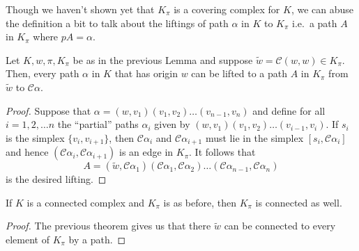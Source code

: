 Though we haven't shown yet that $K_{\pi}$ is a covering complex for $K$, we can abuse the definition a bit to talk about the liftings of path $\alpha$ in $K$ to $K_{\pi}$ i.e.\ a path $A$ in $K_{\pi}$ where $pA = \alpha$.

\begin{lemma}
  \label{lem:pilift}
  Let $K,w,\pi,K_{\pi}$ be as in the previous Lemma and suppose $\tilde{w} = \mathcal{C}(w,w) \in K_{\pi}$. Then, every path $\alpha$ in $K$ that has origin $w$ can be lifted to a path $A$ in $K_{\pi}$ from $\tilde{w}$ to $\mathcal{C}\alpha$.
\end{lemma}

\begin{proof}
  Suppose that $\alpha = (w,v_1)(v_1,v_2) \dots (v_{n-1},v_n)$ and define for all $i = 1, 2, \dots n$ the ``partial'' paths $\alpha_i$ given by $(w,v_1)(v_1,v_2) \dots (v_{i-1},v_i)$. If $s_i$ is the simplex $\{v_i,v_{i+1}\}$, then $\mathcal{C}\alpha_i$ and $\mathcal{C}\alpha_{i+1}$ must lie in the simplex $[s_i,\mathcal{C}\alpha_i]$ and hence $(\mathcal{C}\alpha_i,\mathcal{C}\alpha_{i+1})$ is an edge in $K_{\pi}$. It follows that
  \begin{equation*}
    A = (\tilde{w},\mathcal{C}\alpha_{1})(\mathcal{C}\alpha_1,\mathcal{C}\alpha_2) \dots (\mathcal{C}\alpha_{n-1},\mathcal{C}\alpha_n)
  \end{equation*}
  is the desired lifting.
\end{proof}

\begin{corollary}
  If $K$ is a connected complex and $K_\pi$ is as before, then $K_\pi$ is connected as well.
\end{corollary}
\begin{proof}
  The previous theorem gives us that there $\tilde{w}$ can be connected to every element of $K_{\pi}$ by a path.
\end{proof}

